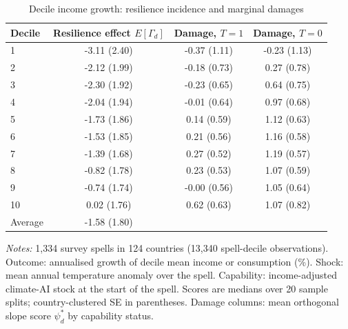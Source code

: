 \begin{table}[htbp]
\centering
\caption{Decile income growth: resilience incidence and marginal damages}\label{tab:decile}
\small
\begin{tabular}{lccc}
\toprule
Decile & Resilience effect $E[\Gamma_d]$ & Damage, $T=1$ & Damage, $T=0$ \\
\midrule
1 & -3.11 (2.40) & -0.37 (1.11) & -0.23 (1.13) \\
2 & -2.12 (1.99) & -0.18 (0.73) & 0.27 (0.78) \\
3 & -2.30 (1.92) & -0.23 (0.65) & 0.64 (0.75) \\
4 & -2.04 (1.94) & -0.01 (0.64) & 0.97 (0.68) \\
5 & -1.73 (1.86) & 0.14 (0.59) & 1.12 (0.63) \\
6 & -1.53 (1.85) & 0.21 (0.56) & 1.16 (0.58) \\
7 & -1.39 (1.68) & 0.27 (0.52) & 1.19 (0.57) \\
8 & -0.82 (1.78) & 0.23 (0.53) & 1.07 (0.59) \\
9 & -0.74 (1.74) & -0.00 (0.56) & 1.05 (0.64) \\
10 & 0.02 (1.76) & 0.62 (0.63) & 1.07 (0.82) \\
\midrule Average & -1.58 (1.80) & & \\
\bottomrule
\end{tabular}
\begin{minipage}{0.95\textwidth}\footnotesize\smallskip
\emph{Notes:} 1,334 survey spells in 124 countries (13,340 spell-decile observations). Outcome:
annualised growth of decile mean income or consumption (\%). Shock: mean annual temperature
anomaly over the spell. Capability: income-adjusted climate-AI stock at the start of the spell.
Scores are medians over 20 sample splits; country-clustered SE in parentheses. Damage columns:
mean orthogonal slope score $\psi^*_d$ by capability status.
\end{minipage}
\end{table}
